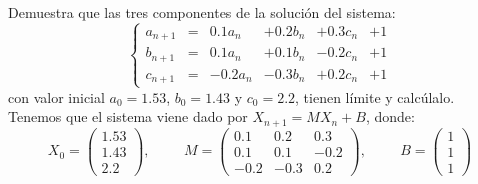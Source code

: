 \begin{ejercicio}
Demuestra que las tres componentes de la solución del sistema:
\begin{equation*}
\left\{
    \begin{array}{rcrrrrr}
        a_{n+1} &=&  0.1a_n &+ 0.2b_n &+ 0.3c_n &+ 1\\
        b_{n+1} &=&  0.1a_n &+ 0.1b_n &- 0.2c_n &+ 1\\
        c_{n+1} &=& -0.2a_n &- 0.3b_n &+ 0.2c_n &+ 1
    \end{array}
\right.
\end{equation*}
con valor inicial $a_0 = 1.53$, $b_0 = 1.43$ y $c_0 = 2.2$, tienen límite y calcúlalo.\\

Tenemos que el sistema viene dado por $X_{n+1} = MX_n+B$, donde:
\begin{equation*}
    X_0 = \begin{pmatrix}
        1.53\\
        1.43\\
        2.2
    \end{pmatrix},\hspace{1cm}
    M = \begin{pmatrix}
        0.1 & 0.2 & 0.3\\
        0.1 & 0.1 & -0.2\\
        -0.2 & -0.3 & 0.2
    \end{pmatrix},
    \hspace{1cm}
    B = \begin{pmatrix}
        1\\
        1\\
        1
    \end{pmatrix}
\end{equation*}


\end{ejercicio}
